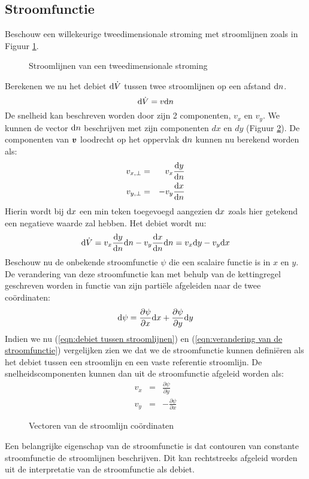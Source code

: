 		\subsection{Stroomfunctie}
Beschouw een willekeurige tweedimensionale stroming met stroomlijnen zoals in Figuur \ref{fig:Stroomfunctie}.
\begin{figure}[htb]
	\centering
	
	\caption{Stroomlijnen van een tweedimensionale stroming}
	\label{fig:Stroomfunctie}
\end{figure}
Berekenen we nu het debiet $\mathrm{d} \dot{V}$ tussen twee stroomlijnen op een afstand $\mathrm{d} n$.
\begin{equation}
	\mathrm{d} \dot{V} = v \mathrm{d} n
\end{equation}
De snelheid kan beschreven worden door zijn 2 componenten, $v_x$ en $v_y$. We kunnen de vector $\mathrm{d} n$ beschrijven met zijn componenten $dx$ en $dy$ (Figuur \ref{fig:Stroomlijn coordinaten}). De componenten van $\boldsymbol{v}$ loodrecht op het oppervlak $\mathrm{d} n$ kunnen nu berekend worden als:
\begin{eqnarray}
	v_{x,\perp} &=&  v_x \frac{\mathrm{d} y}{\mathrm{d} n} \\
	v_{y,\perp} &=& -v_y \frac{\mathrm{d} x}{\mathrm{d} n}
\end{eqnarray}
Hierin wordt bij $\mathrm{d} x$ een min teken toegevoegd aangezien $\mathrm{d} x$ zoals hier getekend een negatieve waarde zal hebben. Het debiet wordt nu:
\begin{equation}
	\mathrm{d} \dot{V} = v_x \frac{\mathrm{d} y}{\mathrm{d} n} \mathrm{d} n - v_y \frac{\mathrm{d} x}{\mathrm{d} n} \mathrm{d} n = v_x \mathrm{d} y - v_y \mathrm{d} x
	\label{eqn:debiet tussen stroomlijnen}
\end{equation}
Beschouw nu de onbekende stroomfunctie $\psi$ die een scalaire functie is in $x$ en $y$. De verandering van deze stroomfunctie kan met behulp van de kettingregel geschreven worden in functie van zijn partiële afgeleiden naar de twee co\"ordinaten:
\begin{equation}
	\mathrm{d} \psi = \frac{\partial \psi}{\partial x} \mathrm{d} x + \frac{\partial \psi}{\partial y} \mathrm{d} y
	\label{eqn:verandering van de stroomfunctie}
\end{equation}
Indien we nu (\ref{eqn:debiet tussen stroomlijnen}) en (\ref{eqn:verandering van de stroomfunctie}) vergelijken zien we dat we de stroomfunctie kunnen definiëren als het debiet tussen een stroomlijn en een vaste referentie stroomlijn. De snelheidscomponenten kunnen dan uit de stroomfunctie afgeleid worden als:
\begin{eqnarray}
	v_x &=&  \frac{\partial \psi}{\partial y} \\
	v_y &=& -\frac{\partial \psi}{\partial x}
\end{eqnarray}
\begin{figure}[htb]
	\centering
	
	\caption{Vectoren van de stroomlijn co\"ordinaten}
	\label{fig:Stroomlijn coordinaten}
\end{figure}
Een belangrijke eigenschap van de stroomfunctie is dat contouren van constante stroomfunctie de stroomlijnen beschrijven. Dit kan rechtstreeks afgeleid worden uit de interpretatie van de stroomfunctie als debiet.

